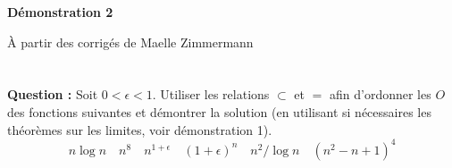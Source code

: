 \documentclass[11pt]{article} %
\newenvironment{question}[1][\unskip]{%
	\par
	\noindent
	\textbf{Question #1:}
	\noindent}
{\medskip}
\begin{document}

\noindent \hrulefill


\centerline{\bfseries Démonstration 2}
\centerline{À partir des corrigés de Maelle Zimmermann}
\noindent \hrulefill

\vspace{1cm}

\section{}

\begin{question}
	Soit $0<\epsilon<1$. Utiliser les relations $\subset$ et $=$ afin d'ordonner les $O$ des fonctions suivantes et démontrer la solution (en utilisant si nécessaires les théorèmes sur les limites, voir démonstration 1).
	$$n\log n \quad n^8 \quad n^{1+\epsilon} \quad (1+\epsilon)^n \quad n^2/\log n \quad (n^2-n+1)^4$$
\end{question}
\end{document}
